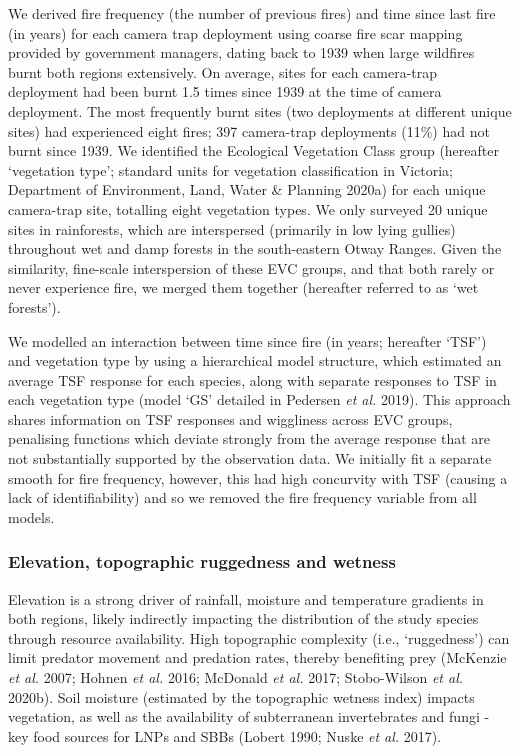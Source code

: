 \documentclass[]{elsarticle} %
\begin{document}
We derived fire frequency (the number of previous fires) and time since last fire (in years) for each camera trap deployment using coarse fire scar mapping provided by government managers, dating back to 1939 when large wildfires burnt both regions extensively. On average, sites for each camera-trap deployment had been burnt 1.5 times since 1939 at the time of camera deployment. The most frequently burnt sites (two deployments at different unique sites) had experienced eight fires; 397 camera-trap deployments (11\%) had not burnt since 1939. We identified the Ecological Vegetation Class group (hereafter `vegetation type'; standard units for vegetation classification in Victoria; Department of Environment, Land, Water \& Planning 2020a) for each unique camera-trap site, totalling eight vegetation types. We only surveyed 20 unique sites in rainforests, which are interspersed (primarily in low lying gullies) throughout wet and damp forests in the south-eastern Otway Ranges. Given the similarity, fine-scale interspersion of these EVC groups, and that both rarely or never experience fire, we merged them together (hereafter referred to as `wet forests').

We modelled an interaction between time since fire (in years; hereafter `TSF') and vegetation type by using a hierarchical model structure, which estimated an average TSF response for each species, along with separate responses to TSF in each vegetation type (model `GS' detailed in Pedersen \emph{et al.} 2019). This approach shares information on TSF responses and wiggliness across EVC groups, penalising functions which deviate strongly from the average response that are not substantially supported by the observation data. We initially fit a separate smooth for fire frequency, however, this had high concurvity with TSF (causing a lack of identifiability) and so we removed the fire frequency variable from all models.

\hypertarget{elevation-topographic-ruggedness-and-wetness}{%
\subsubsection{Elevation, topographic ruggedness and wetness}\label{elevation-topographic-ruggedness-and-wetness}}

Elevation is a strong driver of rainfall, moisture and temperature gradients in both regions, likely indirectly impacting the distribution of the study species through resource availability. High topographic complexity (i.e., `ruggedness') can limit predator movement and predation rates, thereby benefiting prey (McKenzie \emph{et al.} 2007; Hohnen \emph{et al.} 2016; McDonald \emph{et al.} 2017; Stobo-Wilson \emph{et al.} 2020b). Soil moisture (estimated by the topographic wetness index) impacts vegetation, as well as the availability of subterranean invertebrates and fungi - key food sources for LNPs and SBBs (Lobert 1990; Nuske \emph{et al.} 2017).
\end{document}
